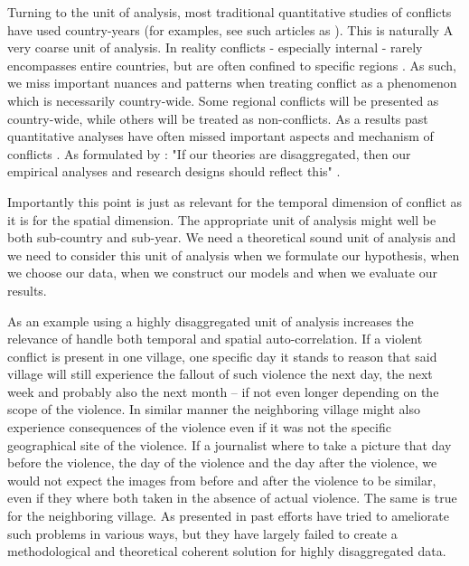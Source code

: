 \documentclass[a4paper]{article}
\begin{document}
Turning to the unit of analysis, most traditional quantitative studies of conflicts have used country-years (for examples, see such articles as \cite{Collier_Hoeffler_1998, Fearon_Laitin_2003, Collier_Hoeffler_2004, Fearon_2004, Ross_2004, Fearon_2005, Hegre_Sambanis_2006, Goldstone_2010}). This is naturally A very coarse unit of analysis. In reality conflicts - especially internal - rarely encompasses entire countries, but are often confined to specific regions \cite[487]{Cederman_Gleditsch_2009}. As such, we miss important nuances and patterns when treating conflict as a phenomenon which is necessarily country-wide. Some regional conflicts will be presented as country-wide, while others will be treated as non-conflicts. As a results past quantitative analyses have often missed important aspects and mechanism of conflicts \cite{Cederman_Gleditsch_2009, Cederman_Gleditsch_Buhaug_2013}. As formulated by \cite{Cederman_Gleditsch_2009}: "If our theories are disaggregated, then our empirical analyses and research designs should reflect this" \citep[490]{Cederman_Gleditsch_2009}.\par 

Importantly this point is just as relevant for the temporal dimension of conflict as it is for the spatial dimension. The appropriate unit of analysis might well be both sub-country and sub-year. We need a theoretical sound unit of analysis and we need to consider this unit of analysis when we formulate our hypothesis, when we choose our data, when we construct our models and when we evaluate our results.\par 

As an example using a highly disaggregated unit of analysis increases the relevance of handle both temporal and spatial auto-correlation. If a violent conflict is present in one village, one specific day it stands to reason that said village will still experience the fallout of such violence the next day, the next week and probably also the next month -- if not even longer depending on the scope of the violence. In similar manner the neighboring village might also experience consequences of the violence even if it was not the specific geographical site of the violence. If a journalist where to take a picture that day before the violence, the day of the violence and the day after the violence, we would not expect the images from before and after the violence to be similar, even if they where both taken in the absence of actual violence. The same is true for the neighboring village. As presented in \cite{SPECIALE} past efforts have tried to ameliorate such problems in various ways, but they have largely failed to create a methodological and theoretical coherent solution for highly disaggregated data.\par 
\end{document}
